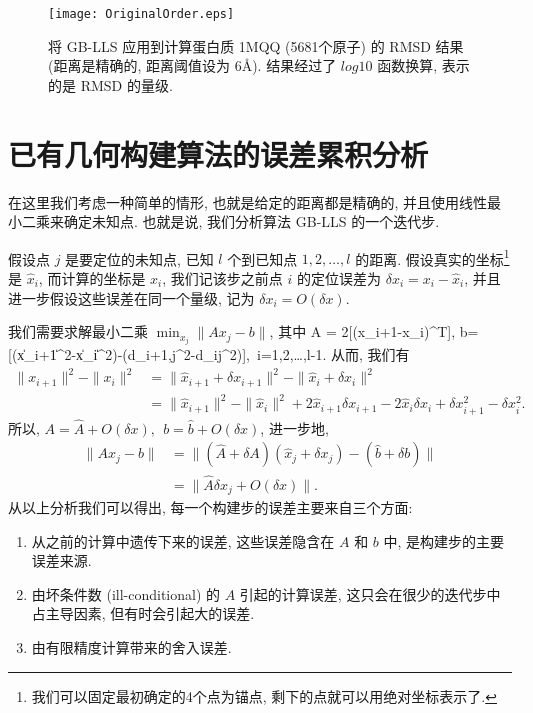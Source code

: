 \begin{figure}[htbp!]
  \centering
  \texttt{[image: OriginalOrder.eps]}\\
  \caption{将 GB-LLS 应用到计算蛋白质 1MQQ (5681个原子) 的 RMSD 结果 (距离是精确的, 距离阈值设为 6\AA). 结果经过了 $log10$ 函数换算, 表示的是 RMSD 的量级.}
  \label{fig:OriginalOrder}
\end{figure}


\section{已有几何构建算法的误差累积分析}
\label{sec:ErrAnalysis}
在这里我们考虑一种简单的情形, 也就是给定的距离都是精确的,
并且使用线性最小二乘来确定未知点. 
也就是说, 我们分析算法 GB-LLS 的一个迭代步.

假设点 $j$ 是要定位的未知点, 已知 $l$ 个到已知点 $1,2,\ldots,l$ 的距离. 
假设真实的坐标\footnote{我们可以固定最初确定的4个点为锚点, 剩下的点就可以用绝对坐标表示了.}
是 $\widehat{x}_i$, 而计算的坐标是 $x_i$, 
我们记该步之前点 $i$ 的定位误差为 $\delta x_i=x_i-\widehat{x}_i$,
并且进一步假设这些误差在同一个量级, 记为 $\delta x_i=O(\delta x)$.

我们需要求解最小二乘 $\min_{x_j} \|Ax_j-b\|$, 其中
\be A = 2[(x_{i+1}-x_i)^T], b=[(\|x_{i+1}\|^2-\|x_i\|^2)-(d_{i+1,j}^2-d_{ij}^2)],~i=1,2,\ldots,l-1.\ee
从而, 我们有
\begin{align}
  \|x_{i+1}\|^2-\|x_i\|^2 & = \|\widehat{x}_{i+1}+\delta x_{i+1}\|^2-\|\widehat{x}_i+\delta x_i\|^2    \\
  & = \|\widehat{x}_{i+1}\|^2-\|\widehat{x}_i\|^2 + 2\widehat{x}_{i+1}\delta x_{i+1} - 2\widehat{x}_i\delta x_i + \delta x_{i+1}^2-\delta x_i^2.
\end{align}
所以, $A=\widehat{A}+O(\delta x),~~b=\widehat{b}+O(\delta x)$, 进一步地, 
\begin{align}
  \|Ax_j-b\| & =\|(\widehat{A}+\delta A)(\widehat{x}_j+\delta x_j)-(\widehat{b} + \delta b)\| \\
  & =\|\widehat{A} \delta x_j + O(\delta x)\|.
\end{align}
从以上分析我们可以得出, 每一个构建步的误差主要来自三个方面:
\begin{enumerate}
  \item 从之前的计算中遗传下来的误差, 这些误差隐含在 $A$ 和 $b$ 中, 是构建步的主要误差来源.
  \item 由坏条件数 (ill-conditional) 的 $A$ 引起的计算误差, 这只会在很少的迭代步中占主导因素, 但有时会引起大的误差.
  \item 由有限精度计算带来的舍入误差.
\end{enumerate}

